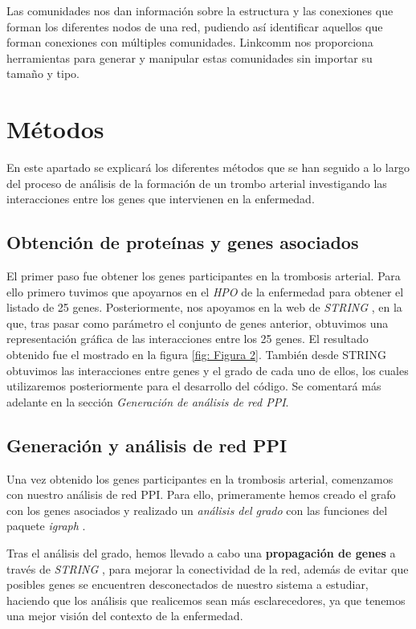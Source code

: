  Las comunidades nos dan información sobre la estructura y las conexiones que forman los diferentes nodos de una red, pudiendo así identificar aquellos que forman conexiones con múltiples comunidades. Linkcomm \cite{linkcomm} nos proporciona herramientas para generar y manipular estas comunidades sin importar su tamaño y tipo.



\section{Métodos}

En este apartado se explicará los diferentes métodos que se han seguido a lo largo del proceso de análisis de la formación de un trombo arterial investigando las interacciones entre los genes que intervienen en la enfermedad.

\subsection{Obtención de proteínas y genes asociados}

El primer paso fue obtener los genes participantes en la trombosis arterial. Para ello primero tuvimos que apoyarnos en el \textit{HPO} de la enfermedad \cite{HPO} para obtener el listado de 25 genes. Posteriormente, nos apoyamos en la web de \textit{STRING} \cite{STRING} , en la que, tras pasar como parámetro el conjunto de genes anterior, obtuvimos una representación gráfica de las interacciones entre los 25 genes. El resultado obtenido fue el mostrado en la figura \ref{fig: Figura 2}. También desde STRING obtuvimos las interacciones entre genes y el grado de cada uno de ellos, los cuales utilizaremos posteriormente para el desarrollo del código. Se comentará más adelante en la sección \textit{Generación de análisis de red PPI}. \\



\subsection{Generación y análisis de red PPI}
Una vez obtenido los genes participantes en la trombosis arterial, comenzamos con nuestro análisis de red PPI. Para ello, primeramente hemos creado el grafo con los genes asociados y realizado un \textit{análisis del grado} con las funciones del paquete \textit{igraph} \cite{igraph}. 

Tras el análisis del grado, hemos llevado a cabo una \textbf{propagación de genes} a través de \textit{STRING} \cite{STRING}, para mejorar la conectividad de la red, además de evitar que posibles genes se encuentren desconectados de nuestro sistema a estudiar, haciendo que los análisis que realicemos sean más esclarecedores, ya que tenemos una mejor visión del contexto de la enfermedad. 

